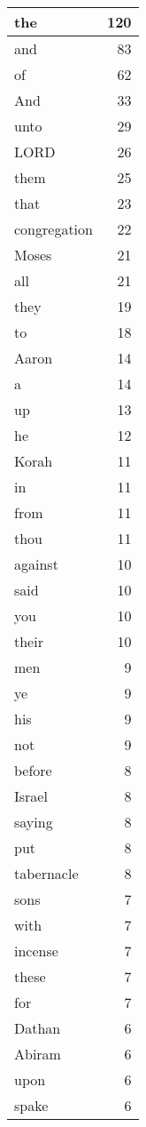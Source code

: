 \begin{center}
\begin{longtable}{l|r}
\hline \hline
\endlastfoot
the & 120 \\ \hline
and & 83 \\ \hline
of & 62 \\ \hline
And & 33 \\ \hline
unto & 29 \\ \hline
LORD & 26 \\ \hline
them & 25 \\ \hline
that & 23 \\ \hline
congregation & 22 \\ \hline
Moses & 21 \\ \hline
all & 21 \\ \hline
they & 19 \\ \hline
to & 18 \\ \hline
Aaron & 14 \\ \hline
a & 14 \\ \hline
up & 13 \\ \hline
he & 12 \\ \hline
Korah & 11 \\ \hline
in & 11 \\ \hline
from & 11 \\ \hline
thou & 11 \\ \hline
against & 10 \\ \hline
said & 10 \\ \hline
you & 10 \\ \hline
their & 10 \\ \hline
men & 9 \\ \hline
ye & 9 \\ \hline
his & 9 \\ \hline
not & 9 \\ \hline
before & 8 \\ \hline
Israel & 8 \\ \hline
saying & 8 \\ \hline
put & 8 \\ \hline
tabernacle & 8 \\ \hline
sons & 7 \\ \hline
with & 7 \\ \hline
incense & 7 \\ \hline
these & 7 \\ \hline
for & 7 \\ \hline
Dathan & 6 \\ \hline
Abiram & 6 \\ \hline
upon & 6 \\ \hline
spake & 6 \\ \hline

\end{longtable}
\end{center}
